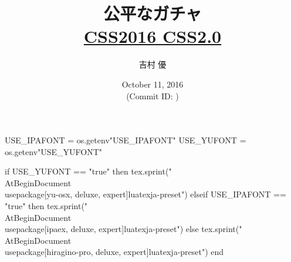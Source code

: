 \hypersetup{colorlinks,linkcolor=,urlcolor=links}

\beamertemplatenavigationsymbolsempty


\usepackage{luacode}
\usepackage{luatexja}
\usepackage{pgfpages}
\usepackage[osf]{mathpazo}

\begin{luacode*}
  USE_IPAFONT = os.getenv"USE_IPAFONT"
  USE_YUFONT = os.getenv"USE_YUFONT"
  
  if USE_YUFONT == "true" then
    tex.sprint("\\AtBeginDocument{\\usepackage[yu-osx, deluxe, expert]{luatexja-preset}}")
  elseif USE_IPAFONT == "true" then
    tex.sprint("\\AtBeginDocument{\\usepackage[ipaex, deluxe, expert]{luatexja-preset}}")
  else
    tex.sprint("\\AtBeginDocument{\\usepackage[hiragino-pro, deluxe, expert]{luatexja-preset}}")
  end
\end{luacode*}

\usepackage{epigraph}
\usepackage{etoolbox}
\usepackage{tikz}
\usepackage{framed}
\usepackage{libertine}
\usepackage{amsmath}
\usepackage{mathtools}

\renewcommand{\kanjifamilydefault}{\gtdefault}


\setmainfont[Numbers=OldStyle, BoldFont=Palatino Bold]{Palatino}
\setsansfont{CMU Sans Serif}
\setmonofont{CMU Typewriter Text}



\title[公平なガチャ]{%
  公平なガチャ \\
  {\normalsize \href{http://www.iwsec.org/css/2016/css2.htm}{CSS2016 CSS2.0}}
}
\author{吉村 優}
\date[October 11, 2016]{%
  October 11, 2016 \\%
  {\footnotesize (Commit ID: \GITAbrHash)}
}





